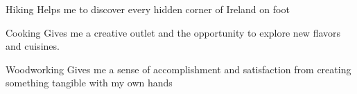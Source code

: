 
\begin{cvskills}

  \cvskill
    {Hiking} %
    {Helps me to discover every hidden corner of Ireland on foot} %

  \cvskill
    {Cooking} %
    {Gives me a creative outlet and the opportunity to explore new flavors and cuisines.} %

  \cvskill
    {Woodworking} %
    {Gives me a sense of accomplishment and satisfaction from creating something tangible with my own hands} %

\end{cvskills}

